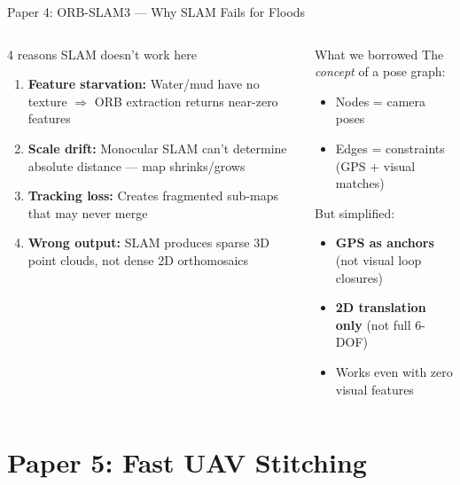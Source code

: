 \documentclass[aspectratio=169, 11pt]{beamer}
\begin{document}
\begin{frame}{Paper 4: ORB-SLAM3 --- Why SLAM Fails for Floods}
\small
\begin{columns}[T]
\begin{alertblock}{4 reasons SLAM doesn't work here}
\begin{enumerate}
    \item \textbf{Feature starvation:} Water/mud have no texture $\Rightarrow$ ORB extraction returns near-zero features
    \item \textbf{Scale drift:} Monocular SLAM can't determine absolute distance --- map shrinks/grows
    \item \textbf{Tracking loss:} Creates fragmented sub-maps that may never merge
    \item \textbf{Wrong output:} SLAM produces sparse 3D point clouds, not dense 2D orthomosaics
\end{enumerate}
\end{alertblock}

\begin{exampleblock}{What we borrowed}
The \textit{concept} of a pose graph:
\begin{itemize}
    \item Nodes = camera poses
    \item Edges = constraints (GPS + visual matches)
\end{itemize}

\vspace{0.3em}
But simplified:
\begin{itemize}
    \item \textbf{GPS as anchors} (not visual loop closures)
    \item \textbf{2D translation only} (not full 6-DOF)
    \item Works even with zero visual features
\end{itemize}
\end{exampleblock}
\end{columns}
\end{frame}

\section{Paper 5: Fast UAV Stitching}
\end{document}
